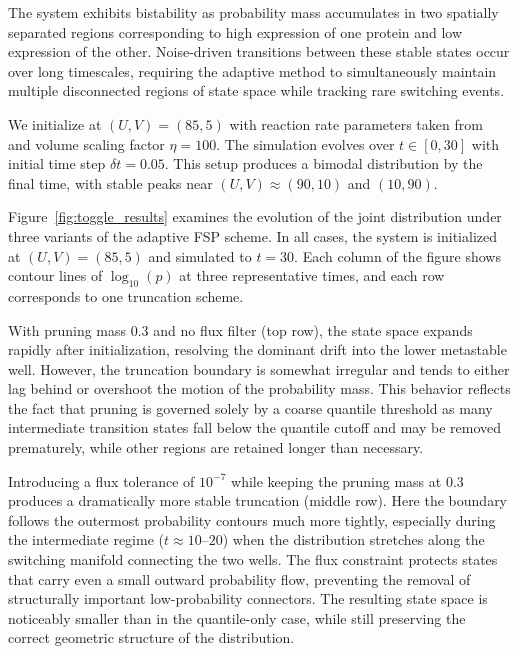 \documentclass[onefignum,onetabnum]{siamart171218}
\begin{document}
The system exhibits bistability as probability mass accumulates in two spatially separated regions corresponding to high expression of one protein and low expression of the other. Noise-driven transitions between these stable states occur over long timescales, requiring the adaptive method to simultaneously maintain multiple disconnected regions of state space while tracking rare switching events.

We initialize at $(U, V) = (85, 5)$ with reaction rate parameters taken from~\cite{Dinh_2020} and volume scaling factor $\eta = 100$. The simulation evolves over $t \in [0, 30]$ with initial time step $\delta t = 0.05$. This setup produces a bimodal distribution by the final time, with stable peaks near $(U, V) \approx (90, 10)$ and $(10, 90)$.

Figure~\ref{fig:toggle_results} examines the evolution of the joint distribution under three variants of the adaptive FSP scheme.  
In all cases, the system is initialized at \((U,V)=(85,5)\) and simulated to \(t=30\).  
Each column of the figure shows contour lines of \(\log_{10}(p)\) at three representative times, and each row corresponds to one truncation scheme.

With pruning mass \(0.3\) and no flux filter (top row), the state space expands rapidly after initialization, resolving the dominant drift into the lower metastable well.  
However, the truncation boundary is somewhat irregular and tends to either lag behind or overshoot the motion of the probability mass.  
This behavior reflects the fact that pruning is governed solely by a coarse quantile threshold as many intermediate transition states fall below the quantile cutoff and may be removed prematurely, while other regions are retained longer than necessary.

Introducing a flux tolerance of \(10^{-7}\) while keeping the pruning mass at \(0.3\) produces a dramatically more stable truncation (middle row).  
Here the boundary follows the outermost probability contours much more tightly, especially during the intermediate regime (\(t\approx 10\)--\(20\)) when the distribution stretches along the switching manifold connecting the two wells.  
The flux constraint protects states that carry even a small outward probability flow, preventing the removal of structurally important low-probability connectors.  
The resulting state space is noticeably smaller than in the quantile-only case, while still preserving the correct geometric structure of the distribution.
\end{document}
